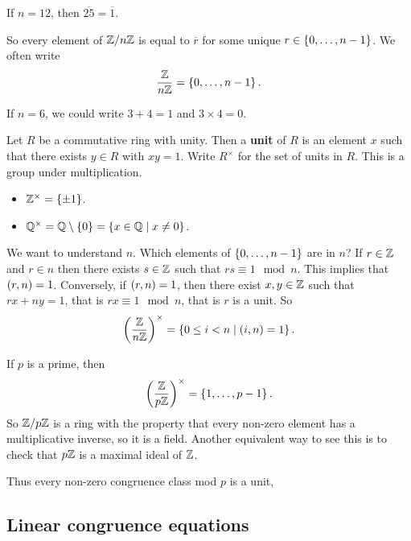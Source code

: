 \begin{example*}
If $ n = 12 $, then $ \overline{25} = \overline{1} $.
\end{example*}

So every element of $ \mathbb{Z} / n\mathbb{Z} $ is equal to $ \overline{r} $ for some unique $ r \in \left\{ 0, \dots, n - 1 \right\} $. We often write
$$ \dfrac{\mathbb{Z}}{n\mathbb{Z}} = \left\{ 0, \dots, n - 1 \right\}. $$

\begin{example*}
If $ n = 6 $, we could write $ 3 + 4 = 1 $ and $ 3 \times 4 = 0 $.
\end{example*}

Let $ R $ be a commutative ring with unity. Then a \textbf{unit} of $ R $ is an element $ x $ such that there exists $ y \in R $ with $ xy = 1 $. Write $ R^\times $ for the set of units in $ R $. This is a group under multiplication.

\begin{example*}
\hfill
\begin{itemize}
\item $ \mathbb{Z}^\times = \left\{ \pm 1 \right\} $.
\item $ \mathbb{Q}^\times = \mathbb{Q} \setminus \left\{ 0 \right\} = \left\{ x \in \mathbb{Q} \mid x \ne 0 \right\} $.
\end{itemize}
\end{example*}

We want to understand $ \unit{n} $. Which elements of $ \left\{ 0, \dots, n - 1 \right\} $ are in $ \unit{n} $? If $ r \in \mathbb{Z} $ and $ r \in \unit{n} $ then there exists $ s \in \mathbb{Z} $ such that $ rs \equiv 1 \mod n $. This implies that $ \left( r, n \right) = 1 $. Conversely, if $ \left( r, n \right) = 1 $, then there exist $ x, y \in \mathbb{Z} $ such that $ rx + ny = 1 $, that is $ rx \equiv 1 \mod n $, that is $ r $ is a unit. So
$$ \left( \dfrac{\mathbb{Z}}{n\mathbb{Z}} \right)^\times = \left\{ 0 \le i < n \mid \left( i, n \right) = 1 \right\}. $$

\begin{example*}
If $ p $ is a prime, then
$$ \left( \dfrac{\mathbb{Z}}{p\mathbb{Z}} \right)^\times = \left\{ 1, \dots, p - 1 \right\}. $$
So $ \mathbb{Z} / p\mathbb{Z} $ is a ring with the property that every non-zero element has a multiplicative inverse, so it is a field. Another equivalent way to see this is to check that $ p\mathbb{Z} $ is a maximal ideal of $ \mathbb{Z} $.
\end{example*}

Thus every non-zero congruence class mod $ p $ is a unit, 


\subsection{Linear congruence equations}

